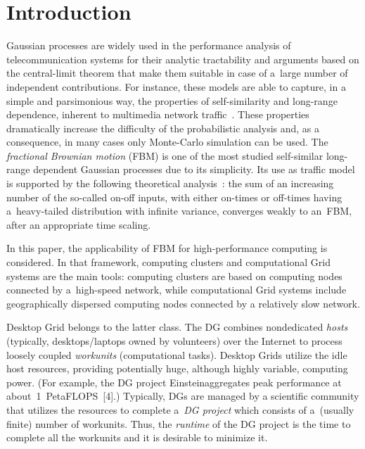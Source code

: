  \begin{multicols}{2}

 \label{st\stat}



\section{Introduction}

\vspace*{-4pt}

\noindent
Gaussian processes are widely used in the performance analysis of telecommunication 
systems for their analytic tractability and arguments based on the central-limit 
theorem that make them suitable in case of a~large number of independent contributions.  For instance, these  models are able to capture, in a simple and parsimonious way,
the properties of self-similarity and long-range dependence, inherent to multimedia
network traffic~\cite{2-luk-1, 3-luk-1}. 
These properties dramatically increase the difficulty of the probabilistic 
analysis and, as a consequence, in many cases only Monte-Carlo simulation can be used.
The \textit{fractional Brownian motion} (FBM) is one of the most studied 
self-similar long-range dependent Gaussian processes due to its simplicity. 
Its use as traffic model is supported  by the following theoretical analysis~\cite{4-luk-1}: 
the sum of an increasing  number of the so-called on-off inputs,
with either on-times or off-times having a~heavy-tailed distribution
with infinite variance, converges weakly to an~FBM, after an
appropriate time  scaling.


In this paper,  the applicability of FBM for high-performance computing is considered. 
In that framework, computing clusters and computational Grid systems are the 
main tools: computing clusters are based on computing nodes connected by 
a~high-speed network, while computational Grid systems include geographically 
dispersed computing nodes connected by a relatively slow network. 

Desktop Grid belongs to the latter class. The DG combines nondedicated 
\textit{hosts} (typically, desktops/laptops owned by volunteers) over the Internet 
to process loosely coupled \textit{workunits} (computational tasks). 
Desktop Grids utilize the idle host resources, providing  potentially huge, although highly 
variable, computing power. (For example, the DG project Einstein\@HOME aggregates 
peak performance at about~1~PetaFLOPS~[4].) Typically,  DGs are 
managed by a scientific community that utilizes the resources to complete 
a~\textit{DG project} which consists of a~(usually finite) number of workunits.
 Thus, the \textit{runtime} of the DG project  is the time to complete all the 
 workunits and it is desirable to minimize it.


\end{multicols}
